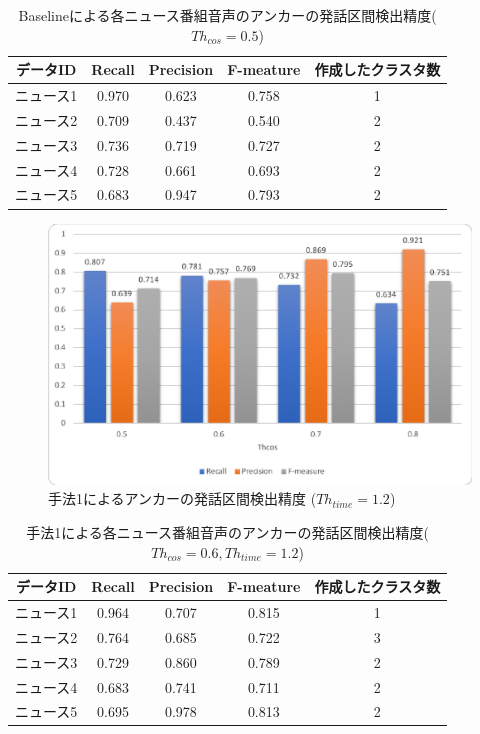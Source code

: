 \begin{table}[H]
  \begin{center}
    \caption{Baselineによる各ニュース番組音声のアンカーの発話区間検出精度($Th_{cos}=0.5$) \label{table:NHK_pause_RPF}}
    \begin{tabular}{|c||c|c|c|c|} \hline
データID & Recall & Precision & F-meature & 作成したクラスタ数\\ \hline
ニュース1 & 0.970 & 0.623 & 0.758 & 1 \\ \hline
ニュース2 & 0.709 & 0.437 & 0.540 & 2 \\ \hline
ニュース3 & 0.736 & 0.719 & 0.727 & 2 \\ \hline
ニュース4 & 0.728 & 0.661 & 0.693 & 2 \\ \hline
ニュース5 & 0.683 & 0.947 & 0.793 & 2 \\ \hline
    \end{tabular}
  \end{center}
\end{table}

\begin{figure}[H]
  \begin{center}
    \includegraphics[scale=0.8]{./figure/get_anchor_prob1.eps}
  \end{center}
  \caption{手法1によるアンカーの発話区間検出精度 ($Th_{time}=1.2$) \label{fig:result_anchor_prob1}}
\end{figure}

\begin{table}[H]
  \begin{center}
    \caption{手法1による各ニュース番組音声のアンカーの発話区間検出精度($Th_{cos}=0.6,Th_{time}=1.2$) \label{table:NHK_pause_RPF}}
    \begin{tabular}{|c||c|c|c|c|} \hline
データID & Recall & Precision & F-meature & 作成したクラスタ数\\ \hline
ニュース1 & 0.964 & 0.707 & 0.815 & 1 \\ \hline
ニュース2 & 0.764 & 0.685 & 0.722 & 3 \\ \hline
ニュース3 & 0.729 & 0.860 & 0.789 & 2 \\ \hline
ニュース4 & 0.683 & 0.741 & 0.711 & 2 \\ \hline
ニュース5 & 0.695 & 0.978 & 0.813 & 2 \\ \hline
    \end{tabular}
  \end{center}
\end{table}

